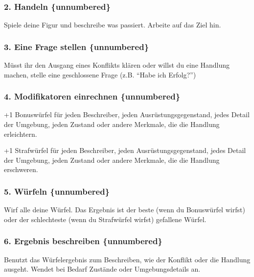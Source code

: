 \documentclass[]{article}
\begin{document}
\subsubsection{2. Handeln \{unnumbered\}}\label{handeln-unnumbered}

Spiele deine Figur und beschreibe was passiert. Arbeite auf das Ziel
hin.

\subsubsection{3. Eine Frage stellen
\{unnumbered\}}\label{eine-frage-stellen-unnumbered}

Müsst ihr den Ausgang eines Konflikts klären oder willst du eine
Handlung machen, stelle eine geschlossene Frage (z.B. ``Habe ich
Erfolg?'')

\subsubsection{4. Modifikatoren einrechnen
\{unnumbered\}}\label{modifikatoren-einrechnen-unnumbered}

+1 Bonuswürfel für jeden Beschreiber, jeden Ausrüstungsgegenstand, jedes
Detail der Umgebung, jeden Zustand oder andere Merkmale, die die
Handlung erleichtern.

+1 Strafwürfel für jeden Beschreiber, jeden Ausrüstungsgegenstand, jedes
Detail der Umgebung, jeden Zustand oder andere Merkmale, die die
Handlung erschweren.

\subsubsection{5. Würfeln \{unnumbered\}}\label{wuxfcrfeln-unnumbered}

Wirf alle deine Würfel. Das Ergebnis ist der beste (wenn du Bonuswürfel
wirfst) oder der schlechteste (wenn du Strafwürfel wirfst) gefallene
Würfel.

\subsubsection{6. Ergebnis beschreiben
\{unnumbered\}}\label{ergebnis-beschreiben-unnumbered}

Benutzt das Würfelergebnis zum Beschreiben, wie der Konflikt oder die
Handlung ausgeht. Wendet bei Bedarf Zustände oder Umgebungsdetails an.
\end{document}
